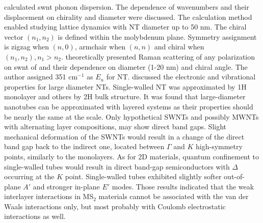 \citeauthor{Dobardzic2005} calculated  \gls{swnt} phonon dispersion. The dependence of wavenumbers and their displacement on chirality and diameter were discussed. The calculation method enabled studying lattice dynamics with NT diameter up to 50 nm. The chiral vector $(n_1, n_2)$ is defined within the molybdenum plane. Symmetry assignment is zigzag when $(n,0)$, armchair when $(n,n)$ and chiral when $(n_1, n_2), n_1>n_2$. \citeauthor{Dobardzic2006} theoretically presented Raman scattering of any polarization on \gls{swnt} of  and their dependence on diameter (1-20 nm) and chiral angle. The author assigned 351 cm$^{-1}$ as $E_u$ for  NT.\cite{Dobardzic2006} \citeauthor{Ghorbani-Asl2013} discussed the electronic and vibrational properties for large diameter  NTs.\cite{Ghorbani-Asl2013} Single-walled NT was approximated by 1H monolayer and others by 2H bulk structure. It was found that large-diameter nanotubes can be approximated with layered systems as their properties should be nearly the same at the scale. Only hypothetical SWNTs and possibly MWNTs with alternating layer compositions, may show direct band gaps. Slight mechanical deformation of the SWNTs would result in a change of the direct band gap back to the indirect one, located between $\Gamma$ and $K$ high-symmetry points, similarly to the monolayers. As for 2D materials, quantum confinement to single-walled tubes would result in direct band-gap semiconductors with $\Delta$ occurring at the $K$ point. Single-walled tubes exhibited slightly softer out-of-plane $A'$ and stronger in-plane $E'$ modes. Those results indicated that the weak interlayer interactions in MS$_2$ materials cannot be associated with the van der Waals interactions only, but most probably with Coulomb electrostatic interactions as well.

